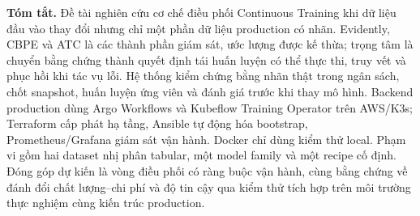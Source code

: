 \textbf{Tóm tắt.}
Đề tài nghiên cứu cơ chế điều phối Continuous Training khi dữ liệu đầu vào thay đổi nhưng chỉ một phần dữ liệu production có nhãn. Evidently, CBPE và ATC là các thành phần giám sát, ước lượng được kế thừa; trọng tâm là chuyển bằng chứng thành quyết định tái huấn luyện có thể thực thi, truy vết và phục hồi khi tác vụ lỗi. Hệ thống kiểm chứng bằng nhãn thật trong ngân sách, chốt snapshot, huấn luyện ứng viên và đánh giá trước khi thay mô hình. Backend production dùng Argo Workflows và Kubeflow Training Operator trên AWS/K3s; Terraform cấp phát hạ tầng, Ansible tự động hóa bootstrap, Prometheus/Grafana giám sát vận hành. Docker chỉ dùng kiểm thử local. Phạm vi gồm hai dataset nhị phân tabular, một model family và một recipe cố định. Đóng góp dự kiến là vòng điều phối có ràng buộc vận hành, cùng bằng chứng về đánh đổi chất lượng--chi phí và độ tin cậy qua kiểm thử tích hợp trên môi trường thực nghiệm cùng kiến trúc production.
